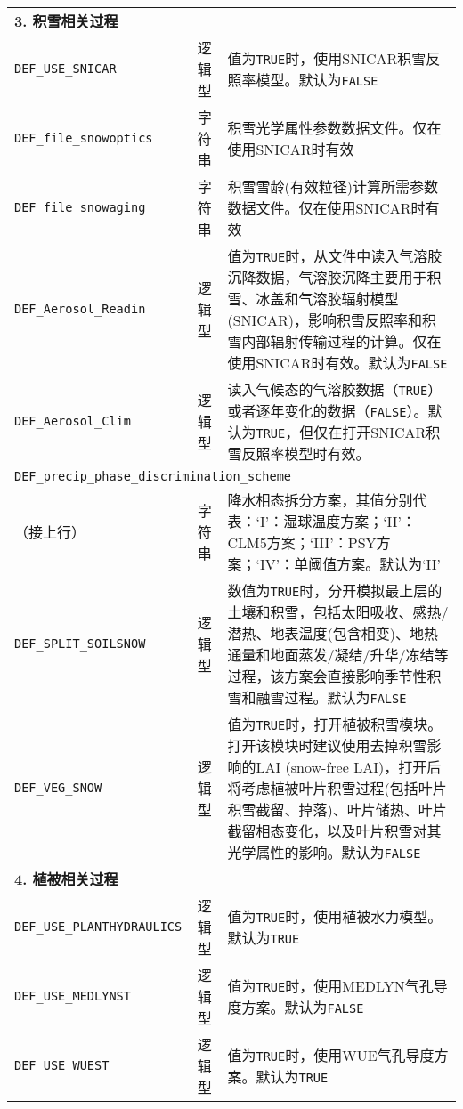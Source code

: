 {\begin{longtable}[!htbp]{lcp{}}
\textbf{3. 积雪相关过程} && \\
\texttt{DEF\_USE\_SNICAR} & 逻辑型 & 值为\texttt{TRUE}时，使用SNICAR积雪反照率模型。默认为\texttt{FALSE} \\
\texttt{DEF\_file\_snowoptics} & 字符串 & 积雪光学属性参数数据文件。仅在使用SNICAR时有效 \\
\texttt{DEF\_file\_snowaging}  & 字符串 & 积雪雪龄(有效粒径)计算所需参数数据文件。仅在使用SNICAR时有效 \\
\texttt{DEF\_Aerosol\_Readin} & 逻辑型 & 值为\texttt{TRUE}时，从文件中读入气溶胶沉降数据，气溶胶沉降主要用于积雪、冰盖和气溶胶辐射模型 (SNICAR)，影响积雪反照率和积雪内部辐射传输过程的计算。仅在使用SNICAR时有效。默认为\texttt{FALSE} \\
\texttt{DEF\_Aerosol\_Clim} & 逻辑型 & 读入气候态的气溶胶数据（\texttt{TRUE}）或者逐年变化的数据（\texttt{FALSE}）。默认为\texttt{TRUE}，但仅在打开SNICAR积雪反照率模型时有效。\\
\multicolumn{3}{l}{\texttt{DEF\_precip\_phase\_discrimination\_scheme}} \\
（接上行）& 字符串 & 降水相态拆分方案，其值分别代表：`I'：湿球温度方案；`II'：CLM5方案；`III'：PSY方案；`IV'：单阈值方案。默认为`II' \\
\texttt{DEF\_SPLIT\_SOILSNOW} & 逻辑型 & 数值为\texttt{TRUE}时，分开模拟最上层的土壤和积雪，包括太阳吸收、感热/潜热、地表温度(包含相变)、地热通量和地面蒸发/凝结/升华/冻结等过程，该方案会直接影响季节性积雪和融雪过程。默认为\texttt{FALSE} \\
\texttt{DEF\_VEG\_SNOW} & 逻辑型 & 值为\texttt{TRUE}时，打开植被积雪模块。打开该模块时建议使用去掉积雪影响的LAI (snow-free LAI)，打开后将考虑植被叶片积雪过程(包括叶片积雪截留、掉落)、叶片储热、叶片截留相态变化，以及叶片积雪对其光学属性的影响。默认为\texttt{FALSE} \\
\midrule

\textbf{4. 植被相关过程} && \\
\texttt{DEF\_USE\_PLANTHYDRAULICS} & 逻辑型 & 值为\texttt{TRUE}时，使用植被水力模型。默认为\texttt{TRUE} \\
\texttt{DEF\_USE\_MEDLYNST} & 逻辑型 & 值为\texttt{TRUE}时，使用MEDLYN气孔导度方案。默认为\texttt{FALSE} \\
\texttt{DEF\_USE\_WUEST} & 逻辑型 & 值为\texttt{TRUE}时，使用WUE气孔导度方案。默认为\texttt{TRUE} \\
\midrule


\end{longtable}}
